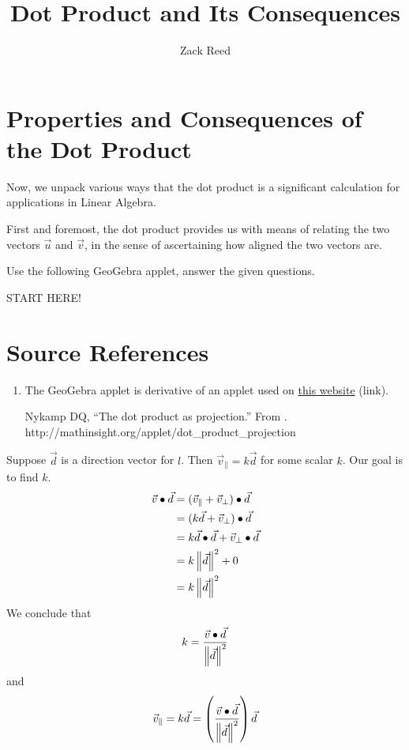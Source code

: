 \documentclass{ximera}
\author{Zack Reed}
\title{Dot Product and Its Consequences}
\begin{document}
\begin{abstract}


\end{abstract}
\maketitle

\section*{Properties and Consequences of the Dot Product}

Now, we unpack various ways that the dot product is a significant calculation for applications in Linear Algebra.

First and foremost, the dot product provides us with means of relating the two vectors $\vec{u}$ and $\vec{v}$, in the sense of ascertaining how aligned the two vectors are. 

\begin{exploration}
   Use the following GeoGebra applet, answer the given questions.

   \begin{center}
   \end{center}
\end{exploration}

START HERE!


\section*{Source References}

\begin{enumerate}
   \item The GeoGebra applet is derivative of an applet used on \href{http://mathinsight.org/applet/dot_product_projection}{this website} (link). 
   
   Nykamp DQ, “The dot product as projection.” From . http://mathinsight.org/applet/dot_product_projection
\end{enumerate}
     
    Suppose $\vec{d}$ is a direction vector for $l$.  Then $\vec{v}_
    {\parallel}=k\vec{d}$ for some scalar $k$.  Our goal is to find $k$. 
    \begin{align*}\vec{v}\bullet\vec{d}&=(\vec{v}_{\parallel}+\vec{v}_{\perp})\bullet\vec{d}\\
    &=(k\vec{d}+\vec{v}_{\perp})\bullet\vec{d}\\
    &=k\vec{d}\bullet\vec{d}+\vec{v}_{\perp}\bullet\vec{d}\\
    &=k\left\|\vec{d}\right\|^2+0\\
    &=k\left\|\vec{d}\right\|^2
    \end{align*}
    We conclude that $$k=\frac{\vec{v}\bullet\vec{d}}{\left\|\vec{d}\right\|^2}$$
    and $$\vec{v}_{\parallel}=k\vec{d}=\left(\frac{\vec{v}\bullet\vec{d}}{\left\|\vec{d}\right\|^2}\right)\vec{d}$$
     
\end{document}
